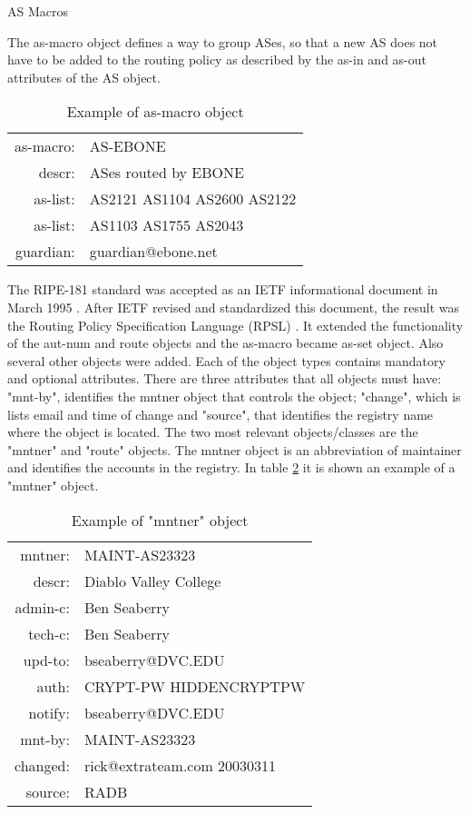 \documentclass[11pt,a4paper]{scrreprt}
\begin{document}
        
AS Macros          
          
The as-macro object defines a way to group ASes, so that a new AS does not have to be added to the routing policy as described by the as-in and as-out attributes of the AS object.          
          
\begin{table}[!h]
\centering
\begin{tabular}{  r  l  }

as-macro:   	&      AS-EBONE\\
descr:    	&      ASes routed by EBONE\\
as-list:    	&      AS2121 AS1104 AS2600 AS2122\\
as-list:    	&      AS1103 AS1755 AS2043\\
guardian:   	&      guardian@ebone.net\\

\end{tabular}
\caption{Example of as-macro object}
\label{table:5}
\end{table} 

The RIPE-181 standard was accepted as an IETF informational document in March 1995 \cite{RFC_1786}. After IETF revised and standardized this document, the result was the Routing Policy Specification Language (RPSL) \cite{RFC_2622}. It extended the functionality of the aut-num and route objects and the as-macro became as-set object. Also several other objects were added.
Each of the object types contains mandatory and optional attributes. There are three attributes that all objects must have: "mnt-by", identifies the mntner object that controls the object; "change", which is lists email and time of change and "source", that identifies the registry name where the object is located.
The two most relevant objects/classes are the "mntner" and "route" objects. The mntner object is an abbreviation of maintainer and identifies the accounts in the registry.
In table \ref{table:5} it is shown an example of a "mntner" object. 

\begin{table}[!h]
\centering
\begin{tabular}{  r  l  }

mntner:   	&      MAINT-AS23323\\
descr:    	&      Diablo Valley College\\
admin-c:    	&      Ben Seaberry\\
tech-c:    	&      Ben Seaberry\\
upd-to:   	&      bseaberry@DVC.EDU\\
auth:   		&      CRYPT-PW HIDDENCRYPTPW\\
notify:   	&      bseaberry@DVC.EDU\\
mnt-by:   	&      MAINT-AS23323\\
changed:   	&      rick@extrateam.com 20030311\\
source:   	&      RADB\\

\end{tabular}
\caption{Example of "mntner" object}
\label{table:5}
\end{table}
\end{document}
